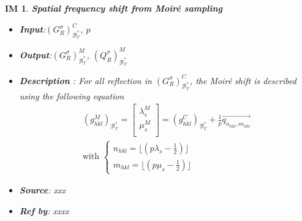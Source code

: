 \documentclass[12pt]{article}
\newtheorem{IM}{IM}
\begin{document}
\begin{IM}
\label{IM_3}
\noindent\colorbox{shadecolorIM}{\normalfont \textbf{Spatial frequency shift from Moir{\'e} sampling}}
\normalfont
\begin{itemize}
\item \textbf{Input}:$(G^{\sigma}_{R})^{C}_{\mathcal{B}_{\Gamma}^{*}}$, $p$
\item \textbf{Output}:$(G^{\sigma}_{R})^{M}_{\mathcal{B}_{\Gamma}^{*}}$, $(Q^{\sigma}_{R})^{M}_{\mathcal{B}_{\Gamma}^{*}}$
\item \textbf{Description} : For all reflection in $(G^{\sigma}_{R})^{C}_{\mathcal{B}_{\Gamma}^{*}}$, the Moir{\'e} shift is described using the following equation
\begin{equation*}
\begin{gathered}
(g_{hkl}^{M})_{\mathcal{B}_{\Gamma}^{*}} = 
\begin{bmatrix}
\lambda_{s}^{M} \\
\mu_{s}^{M} \\ 
\end{bmatrix} =
 (g_{hkl}^{C})_{\mathcal{B}_{\Gamma}^{*}}  +\frac{1}{p} \overrightarrow{q_{n_{hkl},m_{hkl}}}  \\
\text{with }\begin{cases}
n_{hkl} = \lfloor (p\lambda_s - \frac{1}{2}) \rfloor \\
m_{hkl} = \lfloor (p\mu_s - \frac{1}{2}) \rfloor 
\end{cases}
\end{gathered}
\end{equation*}
\item \textbf{Source}: xxx
\item \textbf{Ref by}: xxxx
\end{itemize}
\end{IM}
\end{document}
